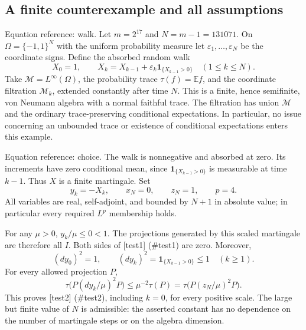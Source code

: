 \documentclass[10pt]{article}
\begin{document}
\subsection*{A finite counterexample and all assumptions}
Equation reference: walk. Let \(m=2^{17}\) and \(N=m-1=131071\). On \(\Omega=\{-1,1\}^{N}\) with the uniform probability measure let \(\varepsilon_1,\ldots,\varepsilon_N\) be the coordinate signs. Define the absorbed random walk \[
 X_0=1,\qquad X_k=X_{k-1}+\varepsilon_k\mathbf 1_{\{X_{k-1}>0\}}
 \quad(1\le k\le N).\] Take \(\mathcal M=L^\infty(\Omega)\), the probability trace \(\tau(f)=\mathbb Ef\), and the coordinate filtration \(\mathcal M_k\), extended constantly after time \(N\). This is a finite, hence semifinite, von Neumann algebra with a normal faithful trace. The filtration has union \(\mathcal M\) and the ordinary trace-preserving conditional expectations. In particular, no issue concerning an unbounded trace or existence of conditional expectations enters this example.\par
Equation reference: choice. The walk is nonnegative and absorbed at zero. Its increments have zero conditional mean, since \(\mathbf 1_{\{X_{k-1}>0\}}\) is measurable at time \(k-1\). Thus \(X\) is a finite martingale. Set \[
 y_k=-X_k,\qquad x_N=0,\qquad z_N=1,\qquad p=4.\] All variables are real, self-adjoint, and bounded by \(N+1\) in absolute value; in particular every required \(L^p\) membership holds.\par
For any \(\mu>0\), \(y_k/\mu\le0<1\). The projections generated by this scaled martingale are therefore all \(I\). Both sides of [test1] (\#test1) are zero. Moreover, \[(dy_0)^2=1,\qquad
 (dy_k)^2=\mathbf 1_{\{X_{k-1}>0\}}\le1\quad(k\ge1).\] For every allowed projection \(P\), \[\tau\bigl(P(dy_k/\mu)^2P\bigr)
 \le\mu^{-2}\tau(P)
 =\tau\bigl(P(z_N/\mu)^2P\bigr).\] This proves [test2] (\#test2), including \(k=0\), for every positive scale. The large but finite value of \(N\) is admissible: the asserted constant has no dependence on the number of martingale steps or on the algebra dimension.\par
\end{document}
